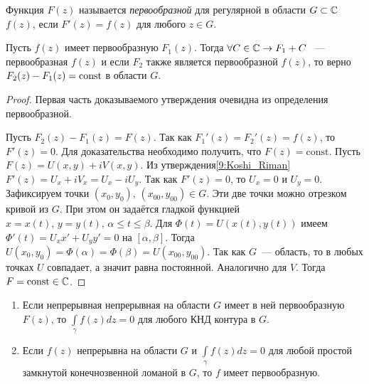 
\begin{definition}
    Функция \(F(z)\) называется \textit{первообразной} для регулярной в области \(G \subset \mathbb{C}\)
    \(f(z)\), если \(F'(z) = f(z)\) для любого \(z \in G\).
\end{definition}

\begin{statement}
    Пусть \(f(z)\) имеет первообразную \(F_1(z)\). Тогда \(\forall C \in \mathbb{C} \rightarrow F_1 + C\)
    ~--- первообразная \(f(z)\) и если \(F_2\) также является первообразной \(f(z)\), то верно
    \(F_2(z) - F_1(z) \hm= \text{const}\) в области \(G\).
\end{statement}

\begin{proof}
    Первая часть доказываемого утверждения очевидна из определения первообразной.

    Пусть \(F_2(z) - F_1(z) = F(z)\). Так как \(F_1'(z)=F_2'(z) = f(z)\), то \(F'(z) = 0\).
    Для доказательства необходимо получить, что \(F(z) = \text{const}\). Пусть \(F(z) =
    U(x, y) + iV(x, y)\). Из утверждения\ref{9:Koshi_Riman} \(F'(z) = U_x + iV_x = U_x - iU_y\). Так
    как \(F'(z) = 0\), то \(U_x = 0\) и \(U_y = 0\). Зафиксируем точки \((x_0, y_0), \, (x_{00},
    y_{00}) \in G\). Эти две точки можно отрезком кривой из \(G\). При этом он задаётся гладкой
    функцией \(x = x(t), \, y = y(t), \, \alpha \le t \le \beta\). Для \(\Phi(t) = U(x(t), y(t))\)
    имеем \(\Phi'(t) = U_x x' + U_y y' = 0\) на \([\alpha, \beta]\). Тогда \(U(x_0, y_0) =
    \Phi(\alpha) = \Phi(\beta) = U(x_{00}, y_{00})\). Так как \(G\)~--- область, то в любых точках
    \(U\) совпадает, а значит равна постоянной. Аналогично для \(V\). Тогда \(F = \text{const} \in
    \mathbb{C}\).
\end{proof}

\begin{statement} \label{12:int_kontur}
    \begin{enumerate}[wide=20pt, label=\arabic*., itemsep=0ex]
        \item Если непрерывная непрерывная на области \(G\) имеет в ней первообразную \(F(z)\), то
        \(\int\limits_\gamma f(z) dz = 0\) для любого КНД контура в \(G\).
        \item Если \(f(z)\) непрерывна на области \(G\) и \(\int\limits_\gamma f(z) dz = 0\) для
        любой простой замкнутой конечнозвенной ломаной в \(G\), то \(f\) имеет первообразную.
    \end{enumerate}
\end{statement}

